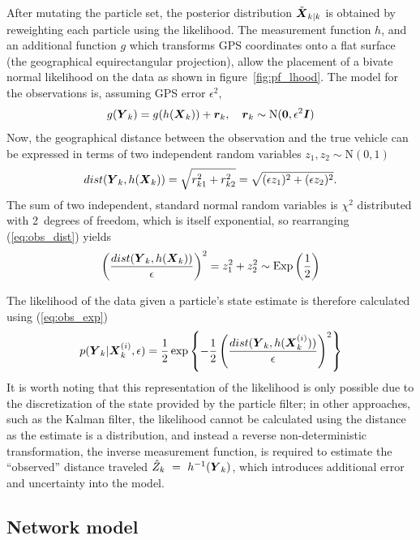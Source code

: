 After mutating the particle set, the posterior distribution $\tilde{\mbox{$\boldsymbol{X}$}}_{k|k}$ 
is obtained by reweighting each particle using the likelihood.
The measurement function $h$,
and an additional function $g$ which transforms GPS coordinates onto a flat
surface (the geographical equirectangular projection),
allow the placement of a bivate normal likelihood on the data
as shown in figure~\ref{fig:pf_lhood}.
The model for the observations is,
assuming GPS error $\epsilon^2$,
\begin{equation}
\label{eq:pf_obs_model}
g(\mbox{$\boldsymbol{Y}$}_k) = g(h(\mbox{$\boldsymbol{X}$}_k)) + \boldsymbol{r}_k,
\quad \boldsymbol{r}_k \sim \mathrm{N}(\boldsymbol{0}, \epsilon^2\boldsymbol{I})
\end{equation}
Now, the geographical distance between the observation and the true vehicle can be expressed
in terms of two independent random variables $z_1, z_2 \sim \mathrm{N}(0,1)$
\begin{equation}
\label{eq:obs_dist}
dist(\mbox{$\boldsymbol{Y}$}_k, h(\mbox{$\boldsymbol{X}$}_k)) = \sqrt{r_{k1}^2 + r_{k2}^2} 
    = \sqrt{(\epsilon z_1)^2 + (\epsilon z_2)^2}.
\end{equation}
The sum of two independent, standard normal random variables 
is $\chi^2$ distributed with 2~degrees of freedom,
which is itself exponential,
so rearranging (\ref{eq:obs_dist}) yields
\begin{equation}
\label{eq:obs_exp}
\left(\frac{dist(\mbox{$\boldsymbol{Y}$}_k, h(\mbox{$\boldsymbol{X}$}_k))}{\epsilon}\right)^2 =
z_1^2 + z_2^2 \sim \mathrm{Exp}\left(\frac{1}{2}\right)
\end{equation}

The likelihood of the data given a particle's state estimate 
is therefore calculated using (\ref{eq:obs_exp})
\begin{equation}
p(\mbox{$\boldsymbol{Y}$}_k | \mbox{$\boldsymbol{X}$}_k^{(i)}, \epsilon) =
\frac{1}{2}\exp\left\{
-\frac{1}{2} \left(\frac{dist(\mbox{$\boldsymbol{Y}$}_k, h(\mbox{$\boldsymbol{X}$}_k^{(i)}))}{\epsilon}\right)^2
\right\}
\end{equation}
It is worth noting that this representation of the likelihood is only
possible due to the discretization of the state provided by the particle filter;
in other approaches, such as the Kalman filter,
the likelihood cannot be calculated using the distance as the estimate
is a distribution, and instead a reverse non-deterministic transformation,
the inverse measurement function,
is required to estimate the ``observed'' distance traveled $\hat Z_k~=~h^{-1}(\mbox{$\boldsymbol{Y}$}_k)$, 
which introduces additional error and uncertainty into the model.



\subsection{Network model}
\label{sec:kf}


